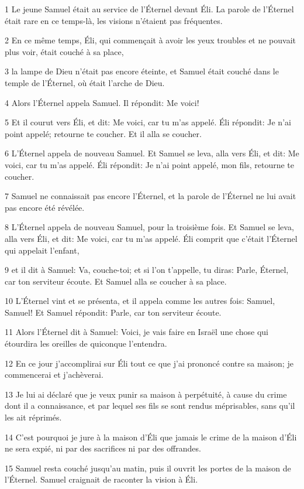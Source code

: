 \par 1 Le jeune Samuel était au service de l'Éternel devant Éli. La parole de l'Éternel était rare en ce temps-là, les visions n'étaient pas fréquentes.
\par 2 En ce même temps, Éli, qui commençait à avoir les yeux troubles et ne pouvait plus voir, était couché à sa place,
\par 3 la lampe de Dieu n'était pas encore éteinte, et Samuel était couché dans le temple de l'Éternel, où était l'arche de Dieu.
\par 4 Alors l'Éternel appela Samuel. Il répondit: Me voici!
\par 5 Et il courut vers Éli, et dit: Me voici, car tu m'as appelé. Éli répondit: Je n'ai point appelé; retourne te coucher. Et il alla se coucher.
\par 6 L'Éternel appela de nouveau Samuel. Et Samuel se leva, alla vers Éli, et dit: Me voici, car tu m'as appelé. Éli répondit: Je n'ai point appelé, mon fils, retourne te coucher.
\par 7 Samuel ne connaissait pas encore l'Éternel, et la parole de l'Éternel ne lui avait pas encore été révélée.
\par 8 L'Éternel appela de nouveau Samuel, pour la troisième fois. Et Samuel se leva, alla vers Éli, et dit: Me voici, car tu m'as appelé. Éli comprit que c'était l'Éternel qui appelait l'enfant,
\par 9 et il dit à Samuel: Va, couche-toi; et si l'on t'appelle, tu diras: Parle, Éternel, car ton serviteur écoute. Et Samuel alla se coucher à sa place.
\par 10 L'Éternel vint et se présenta, et il appela comme les autres fois: Samuel, Samuel! Et Samuel répondit: Parle, car ton serviteur écoute.
\par 11 Alors l'Éternel dit à Samuel: Voici, je vais faire en Israël une chose qui étourdira les oreilles de quiconque l'entendra.
\par 12 En ce jour j'accomplirai sur Éli tout ce que j'ai prononcé contre sa maison; je commencerai et j'achèverai.
\par 13 Je lui ai déclaré que je veux punir sa maison à perpétuité, à cause du crime dont il a connaissance, et par lequel ses fils se sont rendus méprisables, sans qu'il les ait réprimés.
\par 14 C'est pourquoi je jure à la maison d'Éli que jamais le crime de la maison d'Éli ne sera expié, ni par des sacrifices ni par des offrandes.
\par 15 Samuel resta couché jusqu'au matin, puis il ouvrit les portes de la maison de l'Éternel. Samuel craignait de raconter la vision à Éli.
